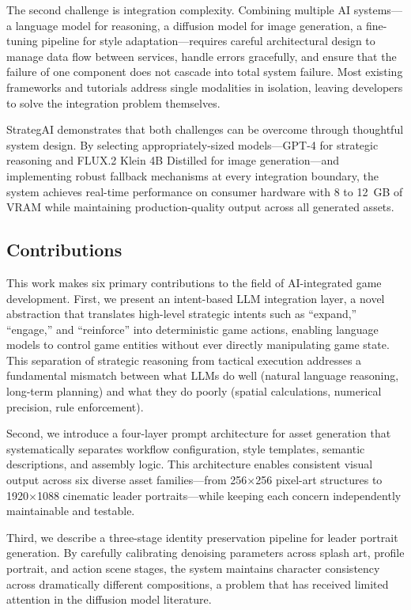 \documentclass[conference]{IEEEtran}
\begin{document}
The second challenge is integration complexity. Combining multiple AI systems---a language model for reasoning, a diffusion model for image generation, a fine-tuning pipeline for style adaptation---requires careful architectural design to manage data flow between services, handle errors gracefully, and ensure that the failure of one component does not cascade into total system failure. Most existing frameworks and tutorials address single modalities in isolation, leaving developers to solve the integration problem themselves.

StrategAI demonstrates that both challenges can be overcome through thoughtful system design. By selecting appropriately-sized models---GPT-4 for strategic reasoning and FLUX.2 Klein 4B Distilled for image generation---and implementing robust fallback mechanisms at every integration boundary, the system achieves real-time performance on consumer hardware with 8 to 12~GB of VRAM while maintaining production-quality output across all generated assets.

\subsection{Contributions}

This work makes six primary contributions to the field of AI-integrated game development. First, we present an intent-based LLM integration layer, a novel abstraction that translates high-level strategic intents such as ``expand,'' ``engage,'' and ``reinforce'' into deterministic game actions, enabling language models to control game entities without ever directly manipulating game state. This separation of strategic reasoning from tactical execution addresses a fundamental mismatch between what LLMs do well (natural language reasoning, long-term planning) and what they do poorly (spatial calculations, numerical precision, rule enforcement).

Second, we introduce a four-layer prompt architecture for asset generation that systematically separates workflow configuration, style templates, semantic descriptions, and assembly logic. This architecture enables consistent visual output across six diverse asset families---from 256$\times$256 pixel-art structures to 1920$\times$1088 cinematic leader portraits---while keeping each concern independently maintainable and testable.

Third, we describe a three-stage identity preservation pipeline for leader portrait generation. By carefully calibrating denoising parameters across splash art, profile portrait, and action scene stages, the system maintains character consistency across dramatically different compositions, a problem that has received limited attention in the diffusion model literature.
\end{document}
